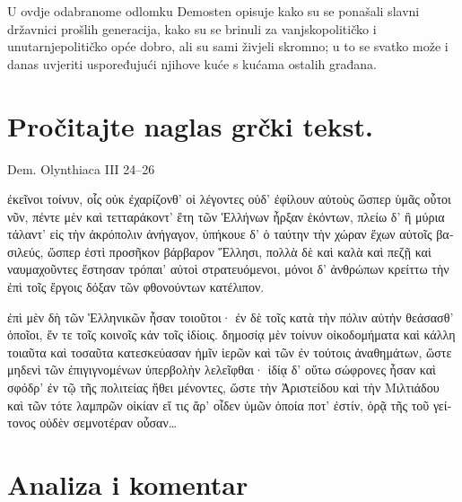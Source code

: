 U ovdje odabranome odlomku Demosten opisuje kako su se ponašali slavni državnici prošlih generacija, kako su se brinuli za vanjskopolitičko i unutarnjepolitičko opće dobro, ali su sami živjeli skromno; u to se svatko može i danas uvjeriti uspoređujući njihove kuće s kućama ostalih građana.



\section*{Pročitajte naglas grčki tekst.}

Dem. Olynthiaca III 24–26


\medskip


{\large

\begin{greek}

\noindent  ἐκεῖνοι τοίνυν, οἷς οὐκ ἐχαρίζονθ' οἱ λέγοντες οὐδ' ἐφίλουν αὐτοὺς ὥσπερ ὑμᾶς οὗτοι νῦν, πέντε μὲν καὶ τετταράκοντ' ἔτη τῶν Ἑλλήνων ἦρξαν ἑκόντων, πλείω δ' ἢ μύρια τάλαντ' εἰς τὴν ἀκρόπολιν ἀνήγαγον, ὑπήκουε δ' ὁ ταύτην τὴν χώραν ἔχων αὐτοῖς βασιλεύς, ὥσπερ ἐστὶ προσῆκον βάρβαρον Ἕλλησι, πολλὰ δὲ καὶ καλὰ καὶ πεζῇ καὶ ναυμαχοῦντες ἔστησαν τρόπαι' αὐτοὶ στρατευόμενοι, μόνοι δ' ἀνθρώπων κρείττω τὴν ἐπὶ τοῖς ἔργοις δόξαν τῶν φθονούντων κατέλιπον.

ἐπὶ μὲν δὴ τῶν Ἑλληνικῶν ἦσαν τοιοῦτοι· ἐν δὲ τοῖς κατὰ τὴν πόλιν αὐτὴν θεάσασθ' ὁποῖοι, ἔν τε τοῖς κοινοῖς κἀν τοῖς ἰδίοις. δημοσίᾳ μὲν τοίνυν οἰκοδομήματα καὶ κάλλη τοιαῦτα καὶ τοσαῦτα κατεσκεύασαν ἡμῖν ἱερῶν καὶ τῶν ἐν τούτοις ἀναθημάτων, ὥστε μηδενὶ τῶν ἐπιγιγνομένων ὑπερβολὴν λελεῖφθαι· ἰδίᾳ δ' οὕτω σώφρονες ἦσαν καὶ σφόδρ' ἐν τῷ τῆς πολιτείας ἤθει μένοντες, ὥστε τὴν Ἀριστείδου καὶ τὴν Μιλτιάδου καὶ τῶν τότε λαμπρῶν οἰκίαν εἴ τις ἄρ' οἶδεν ὑμῶν ὁποία ποτ' ἐστίν, ὁρᾷ τῆς τοῦ γείτονος οὐδὲν σεμνοτέραν οὖσαν\dots

\end{greek}

}


\section*{Analiza i komentar}



